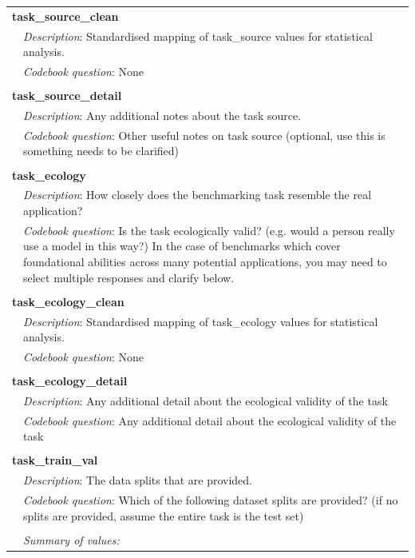 {\begin{longtable}{p{}p{}}
\\
\multicolumn{2}{l}{\textbf{task\_source\_clean}} \\
& \textit{Description}: Standardised mapping of task\_source values for statistical analysis. \\
& \textit{Codebook question}: None \\
\\
\multicolumn{2}{l}{\textbf{task\_source\_detail}} \\
& \textit{Description}: Any additional notes about the task source. \\
& \textit{Codebook question}: Other useful notes on task source (optional, use this is something needs to be clarified) \\
\\
\multicolumn{2}{l}{\textbf{task\_ecology}} \\
& \textit{Description}: How closely does the benchmarking task resemble the real application? \\
& \textit{Codebook question}: Is the task ecologically valid? (e.g. would a person really use a model in this way?) In the case of benchmarks which cover foundational abilities across many potential applications, you may need to select multiple responses and clarify below. \\
\\
\multicolumn{2}{l}{\textbf{task\_ecology\_clean}} \\
& \textit{Description}: Standardised mapping of task\_ecology values for statistical analysis. \\
& \textit{Codebook question}: None \\
\\
\multicolumn{2}{l}{\textbf{task\_ecology\_detail}} \\
& \textit{Description}: Any additional detail about the ecological validity of the task \\
& \textit{Codebook question}: Any additional detail about the ecological validity of the task \\
\\
\multicolumn{2}{l}{\textbf{task\_train\_val}} \\
& \textit{Description}: The data splits that are provided. \\
& \textit{Codebook question}: Which of the following dataset splits are provided? (if no splits are provided, assume the entire task is the test set) \\
\\
& \textit{Summary of values:} \\

\end{longtable}}
